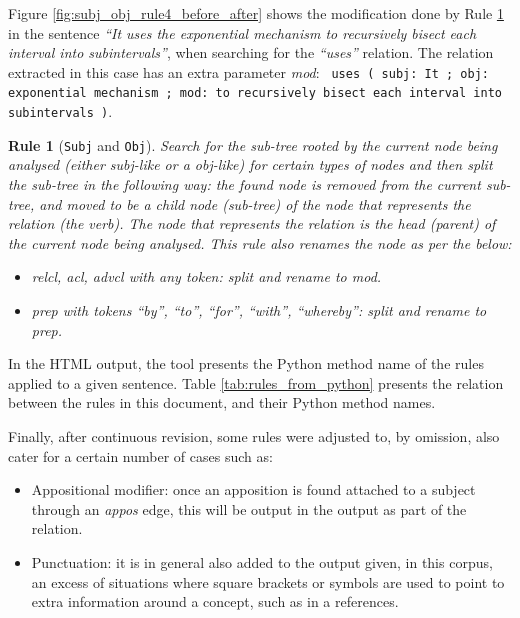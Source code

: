 \documentclass[11pt,a4paper,openright]{memoir}
\newtheorem{treerule}{Rule}
\begin{document}
Figure \ref{fig:subj_obj_rule4_before_after} shows the modification done by Rule \ref{treerule:rule_subj4} in the sentence \emph{\enquote{It uses the exponential mechanism to recursively bisect each interval into subintervals}}, when searching for the \emph{\enquote{uses}} relation. The relation extracted in this case has an extra parameter \emph{mod}: \texttt{	uses	( subj: It ; obj: exponential mechanism ; mod: to recursively bisect each interval into subintervals )}.

\begin{treerule}[\texttt{Subj} and \texttt{Obj}]
\label{treerule:rule_subj4}
Search for the sub-tree rooted by the current node being analysed (either \emph{subj}-like or a \emph{obj}-like) for certain types of nodes and then split the sub-tree in the following way: the found node is removed from the current sub-tree, and moved to be a child node (sub-tree) of the node that represents the relation (the verb). The node that represents the relation is the head (parent) of the current node being analysed. This rule also renames the node as per the below:
	\begin{itemize}
	  \item \emph{relcl}, \emph{acl}, \emph{advcl} with any token: split and rename to  \emph{mod}.
	  \item \emph{prep} with tokens \emph{\enquote{by}}, \emph{\enquote{to}}, \emph{\enquote{for}}, \emph{\enquote{with}}, \emph{\enquote{whereby}}: split and rename to \emph{prep}.
	\end{itemize}
\end{treerule}


In the HTML output, the tool presents the Python method name of the rules applied to a given sentence. Table \ref{tab:rules_from_python} presents the relation between the rules in this document, and their Python method names.

Finally, after continuous revision, some rules were adjusted to, by omission, also cater for a certain number of cases such as:
	\begin{itemize}
	  \item Appositional modifier: once an apposition is found attached to a subject through an \emph{appos} edge, this will be output in the output as part of the relation.
	  \item Punctuation: it is in general also added to the output given, in this corpus, an excess of situations where square brackets or symbols are used to point to extra information around a concept, such as in a references. 
	\end{itemize}
\end{document}
